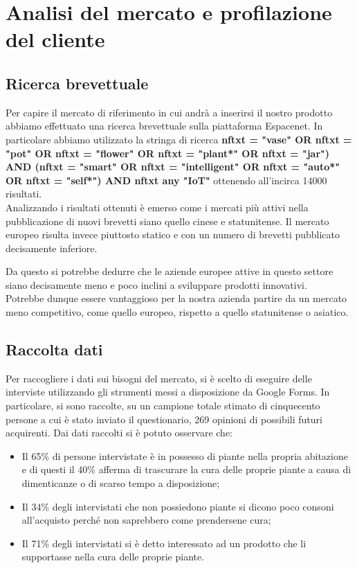 \newpage
\section{Analisi del mercato e profilazione del cliente}

\subsection{Ricerca brevettuale}

Per capire il mercato di riferimento in cui andrà a inserirsi il nostro prodotto abbiamo effettuato una ricerca brevettuale sulla piattaforma Espacenet. In particolare abbiamo utilizzato la stringa di ricerca \textbf{nftxt = "vase" OR nftxt = "pot" OR nftxt = "flower" OR nftxt = "plant*" OR nftxt = "jar") AND (nftxt = "smart" OR nftxt = "intelligent" OR nftxt = "auto*" OR nftxt = "self*") AND nftxt any "IoT"} ottenendo all'incirca 14000 risultati.\\Analizzando i risultati ottenuti è emerso come i mercati più attivi nella pubblicazione di nuovi brevetti siano quello cinese e statunitense. Il mercato europeo risulta invece piuttosto statico e con un numero di brevetti pubblicato decisamente inferiore.

Da questo si potrebbe dedurre che le aziende europee attive in questo settore siano decisamente meno e poco inclini a sviluppare prodotti innovativi.\\Potrebbe dunque essere vantaggioso per la nostra azienda partire da un mercato meno competitivo, come quello europeo, rispetto a quello statunitense o asiatico. 

\subsection{Raccolta dati}

Per raccogliere i dati sui bisogni del mercato, si è scelto di eseguire delle interviste utilizzando gli strumenti messi a disposizione da Google Forms. In particolare, si sono raccolte, su un campione totale stimato di cinquecento persone a cui è stato inviato il questionario, 269 opinioni di possibili futuri acquirenti.
Dai dati raccolti si è potuto osservare che:

\begin{itemize}
	\item Il 65\% di persone intervistate è in possesso di piante nella propria abitazione e di questi il 40\% afferma di trascurare la cura delle proprie piante a causa di dimenticanze o di scarso tempo a disposizione;
	
	\item Il 34\% degli intervistati che non possiedono piante si dicono poco consoni all’acquisto perché non saprebbero come prendersene cura;
	
	\item Il 71\% degli intervistati si è detto interessato ad un prodotto che li supportasse nella cura delle proprie piante.
\end{itemize}

